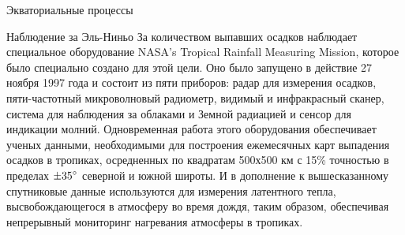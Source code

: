 \begin{chapter}{Экваториальные процессы}
\begin{section}{Наблюдение за Эль-Ниньо}
За количеством выпавших осадков наблюдает специальное оборудование
NASA’s Tropical Rainfall Measuring Mission, которое было специально
создано для этой цели. Оно было запущено в действие 27 ноября 1997
года и состоит из пяти приборов: радар для измерения осадков,
пяти-частотный микроволновый радиометр, видимый и инфракрасный сканер,
система для наблюдения за облаками и Земной радиацией и сенсор для
индикации молний. Одновременная работа этого оборудования обеспечивает
ученых данными, необходимыми для построения ежемесячных карт выпадения
осадков в тропиках, осредненных по квадратам 500х500 км с 15\%
точностью в пределах $\pm {35}^\circ$ северной и южной широты. И в
дополнение к вышесказанному спутниковые данные используются для
измерения латентного тепла, высвобождающегося в атмосферу во время
дождя, таким образом, обеспечивая непрерывный мониторинг нагревания
атмосферы в тропиках.
%
\end{section}


\end{chapter}
